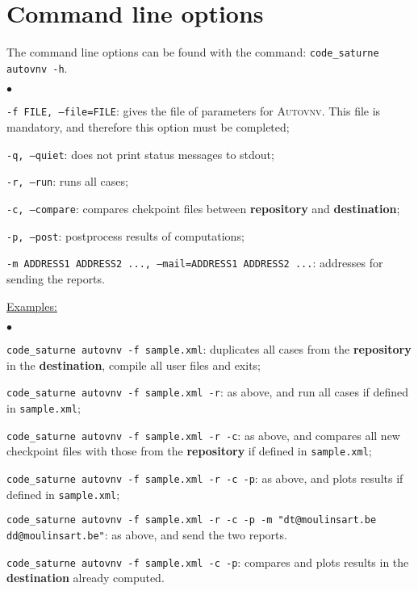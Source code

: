 \documentclass[a4paper,10pt,twoside]{csshortdoc}
\begin{document}
\section{Command line options}

The command line options can be found with the command: \texttt{code\_saturne
autovnv -h}.

\begin{list}{$\bullet$}{}
\item \texttt{-f FILE, --file=FILE}: gives the file of parameters for
\textsc{Autovnv}. This file is mandatory, and therefore this option must be
completed;
\item \texttt{-q, --quiet}: does not print status messages to stdout;
\item \texttt{-r, --run}: runs all cases;
\item \texttt{-c, --compare}: compares chekpoint files between
\textbf{repository} and \textbf{destination};
\item \texttt{-p, --post}: postprocess results of computations;
\item \texttt{-m ADDRESS1 ADDRESS2 ..., --mail=ADDRESS1 ADDRESS2 ...}: addresses
for sending the reports.
\end{list}

\underline{Examples:}

\begin{list}{$\bullet$}{}
\item \texttt{code\_saturne autovnv -f sample.xml}: duplicates all cases from
the \textbf{repository} in the \textbf{destination}, compile all user files
and exits;
\item \texttt{code\_saturne autovnv -f sample.xml -r}: as above, and run all
cases if defined in \texttt{sample.xml};
\item \texttt{code\_saturne autovnv -f sample.xml -r -c}: as above, and compares
all new checkpoint files with those from the \textbf{repository} if defined
in \texttt{sample.xml};
\item \texttt{code\_saturne autovnv -f sample.xml -r -c -p}: as above, and plots
results if defined in \texttt{sample.xml};
\item \texttt{code\_saturne autovnv -f sample.xml -r -c -p -m
"dt@moulinsart.be dd@moulinsart.be"}: as above, and send the two
reports.
\item \texttt{code\_saturne autovnv -f sample.xml -c -p}: compares and plots
results in the \textbf{destination} already computed.
\end{list}
\end{document}
